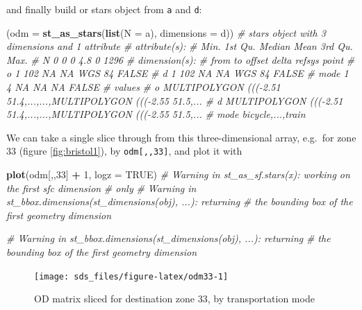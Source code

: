 \documentclass[]{book}
\newenvironment{Shaded}{\begin{snugshade}}{\end{snugshade}}
\newcommand{\CommentTok}[1]{\textcolor[rgb]{0.56,0.35,0.01}{\textit{#1}}}
\newcommand{\DataTypeTok}[1]{\textcolor[rgb]{0.13,0.29,0.53}{#1}}
\newcommand{\DecValTok}[1]{\textcolor[rgb]{0.00,0.00,0.81}{#1}}
\newcommand{\KeywordTok}[1]{\textcolor[rgb]{0.13,0.29,0.53}{\textbf{#1}}}
\newcommand{\NormalTok}[1]{#1}
\newcommand{\OperatorTok}[1]{\textcolor[rgb]{0.81,0.36,0.00}{\textbf{#1}}}
\newcommand{\OtherTok}[1]{\textcolor[rgb]{0.56,0.35,0.01}{#1}}
\newcommand{\StringTok}[1]{\textcolor[rgb]{0.31,0.60,0.02}{#1}}
\begin{document}
and finally build or stars object from \texttt{a} and \texttt{d}:

\begin{Shaded}
\begin{Highlighting}[]
\NormalTok{(}\DataTypeTok{odm =} \KeywordTok{st_as_stars}\NormalTok{(}\KeywordTok{list}\NormalTok{(}\DataTypeTok{N =}\NormalTok{ a), }\DataTypeTok{dimensions =}\NormalTok{ d))}
\CommentTok{# stars object with 3 dimensions and 1 attribute}
\CommentTok{# attribute(s):}
\CommentTok{#    Min. 1st Qu. Median Mean 3rd Qu. Max.}
\CommentTok{# N     0       0      0  4.8       0 1296}
\CommentTok{# dimension(s):}
\CommentTok{#      from  to offset delta refsys point}
\CommentTok{# o       1 102     NA    NA WGS 84 FALSE}
\CommentTok{# d       1 102     NA    NA WGS 84 FALSE}
\CommentTok{# mode    1   4     NA    NA     NA FALSE}
\CommentTok{#                                                                 values}
\CommentTok{# o    MULTIPOLYGON (((-2.51 51.4,...,...,MULTIPOLYGON (((-2.55 51.5,...}
\CommentTok{# d    MULTIPOLYGON (((-2.51 51.4,...,...,MULTIPOLYGON (((-2.55 51.5,...}
\CommentTok{# mode                                                 bicycle,...,train}
\end{Highlighting}
\end{Shaded}

We can take a single slice through from this three-dimensional
array, e.g.~for zone 33 (figure \ref{fig:bristol1}), by \texttt{odm{[},,33{]}},
and plot it with

\begin{Shaded}
\begin{Highlighting}[]
\KeywordTok{plot}\NormalTok{(odm[,,}\DecValTok{33}\NormalTok{] }\OperatorTok{+}\StringTok{ }\DecValTok{1}\NormalTok{, }\DataTypeTok{logz =} \OtherTok{TRUE}\NormalTok{)}
\CommentTok{# Warning in st_as_sf.stars(x): working on the first sfc dimension}
\CommentTok{# only}
\CommentTok{# Warning in st_bbox.dimensions(st_dimensions(obj), ...): returning}
\CommentTok{# the bounding box of the first geometry dimension}

\CommentTok{# Warning in st_bbox.dimensions(st_dimensions(obj), ...): returning}
\CommentTok{# the bounding box of the first geometry dimension}
\end{Highlighting}
\end{Shaded}

\begin{figure}

{\centering \texttt{[image: sds\_files/figure-latex/odm33-1]} 

}

\caption{OD matrix sliced for destination zone 33, by transportation mode}\label{fig:odm33}
\end{figure}
\end{document}
